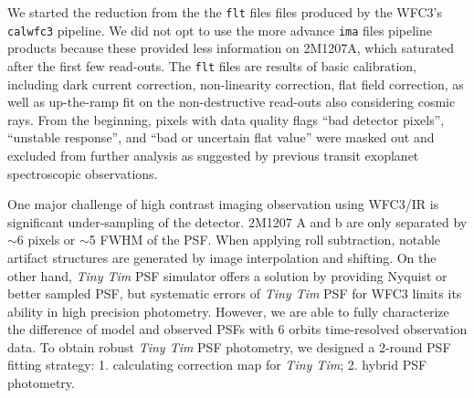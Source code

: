 \documentclass[apj]{emulateapj}
\newcommand{\ima}{\texttt{ima} files }
\newcommand{\flt}{\texttt{flt} files }
\newcommand{\tinytim}{\textit{Tiny Tim}}
\begin{document}
We started the reduction from the the \flt files produced by the
WFC3's \texttt{calwfc3} pipeline. We did not opt to use the more
advance \ima pipeline products because these provided less information
on 2M1207A, which saturated after the first few read-outs.  The \flt
are results of basic calibration, including dark current correction,
non-linearity correction, flat field correction, as well as
up-the-ramp fit on the non-destructive read-outs also considering
cosmic rays. From the beginning, pixels with data quality flags ``bad
detector pixels'', ``unstable response'', and ``bad
or uncertain flat value'' were masked out and excluded from
further analysis as suggested by previous transit exoplanet
spectroscopic observations\citep[e.g.][]{Berta2012, Kreidberg2014}.


One major challenge of high contrast imaging observation using WFC3/IR
is significant under-sampling of the detector.  2M1207 A and b are
only separated by $\sim6$ pixels or $\sim$5 FWHM of the PSF. When
applying roll subtraction, notable artifact structures are generated
by image interpolation and shifting. On the other hand, \tinytim{} PSF
simulator\citep{Krist1995} offers a solution by providing Nyquist or better
sampled PSF, but systematic errors of \tinytim{} PSF for WFC3 limits
its ability in high precision photometry\citep{Biretta2014}. However,
we are able to fully characterize the difference of model and observed
PSFs with 6 orbits time-resolved observation data. To obtain robust \tinytim{} PSF
photometry, we designed a 2-round PSF fitting strategy: 1. calculating
correction map for \tinytim{}; 2. hybrid PSF photometry.
\end{document}
